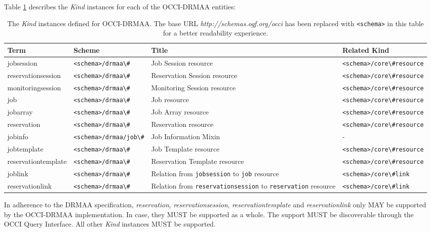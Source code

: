 \documentclass[10pt]{article}
\newcommand{\h}[1]{\lstinline|#1|}
\begin{document}
Table \ref{tab:kinddefinitions} describes the \emph{Kind} instances for each of the OCCI-DRMAA entities:

\begin{table}[ht]
\centering
\begin{tabularx}{\textwidth}{|l|l|X|l|}
\hline
Term & Scheme & Title & Related Kind \\
\hline
jobsession             & \h{<schema>/drmaa\#}             & Job Session resource            & \h{<schema>/core\#resource} \\
reservationsession     & \h{<schema>/drmaa\#}             & Reservation Session resource    & \h{<schema>/core\#resource} \\
monitoringsession      & \h{<schema>/drmaa\#}             & Monitoring Session resource     & \h{<schema>/core\#resource} \\
job                    & \h{<schema>/drmaa\#}             & Job resource                    & \h{<schema>/core\#resource} \\
jobarray               & \h{<schema>/drmaa\#}             & Job Array resource              & \h{<schema>/core\#resource} \\
reservation            & \h{<schema>/drmaa\#}             & Reservation resource            & \h{<schema>/core\#resource} \\
jobinfo                & \h{<schema>/drmaa/job\#}         & Job Information Mixin           & - \\
jobtemplate            & \h{<schema>/drmaa\#}             & Job Template resource           & \h{<schema>/core\#resource} \\
reservationtemplate    & \h{<schema>/drmaa\#}             & Reservation Template resource   & \h{<schema>/core\#resource} \\
joblink                & \h{<schema>/drmaa\#}             & Relation from \h{jobsession} to \h{job} resource & \h{<schema>/core\#link} \\
reservationlink        & \h{<schema>/drmaa\#}             & Relation from \h{reservationsession} to \h{reservation} resource & \h{<schema>/core\#link} \\
\hline
\end{tabularx}
\caption{The \emph{Kind} instances defined for OCCI-DRMAA.  The base URL \emph{http://schemas.ogf.org/occi} has been replaced with \h{<schema>} in this table for a better readability experience.}
\label{tab:kinddefinitions}
\end{table}

In adherence to the DRMAA specification, \emph{reservation}, \emph{reservationsession}, \emph{reservationtemplate} and \emph{reservationlink} only MAY be supported by the OCCI-DRMAA implementation. In case, they MUST be supported as a whole. The support MUST be discoverable through the OCCI Query Interface. All other \emph{Kind} instances MUST be supported. 
\end{document}
